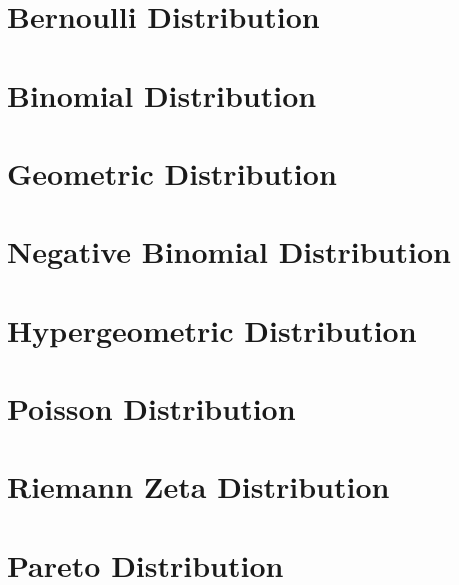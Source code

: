 \section{Bernoulli Distribution}

\section{Binomial Distribution}

\section{Geometric Distribution}

\section{Negative Binomial Distribution}

\section{Hypergeometric Distribution}

\section{Poisson Distribution}

\section{Riemann Zeta Distribution}

\section{Pareto Distribution}

